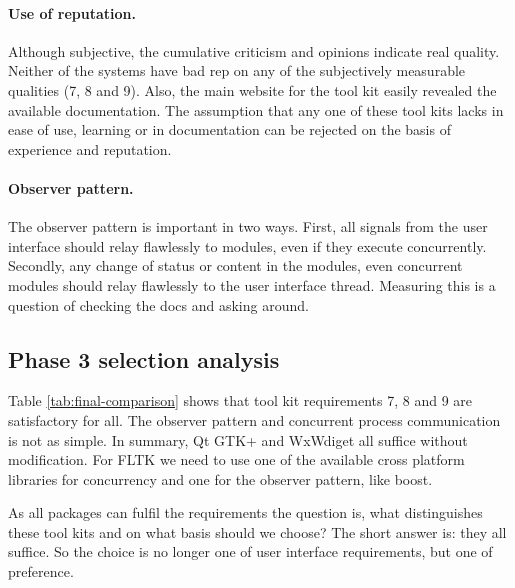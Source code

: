\paragraph{Use of reputation.} Although subjective, the cumulative criticism
and opinions indicate real quality. Neither of the systems have bad rep on any
of the subjectively measurable qualities (7, 8 and 9). Also, the main website
for the tool kit easily revealed the available documentation. The assumption
that any one of these tool kits lacks in ease of use, learning or in
documentation can be rejected on the basis of experience and reputation. 

\paragraph{Observer pattern.} The observer pattern is important in two ways.
First, all signals from the user interface should relay flawlessly to modules,
even if they execute concurrently. Secondly, any change of status or content in
the modules, even concurrent modules should relay flawlessly to the user
interface thread. Measuring this is a question of checking the docs and asking
around. 


\subsection{Phase 3 selection analysis}

Table \ref{tab:final-comparison} shows that tool kit requirements 7, 8 and 9
are satisfactory for all. The observer pattern and concurrent process
communication is not as simple. In summary, Qt GTK+ and WxWdiget all suffice
without modification. For FLTK we need to use one of the available cross
platform libraries for concurrency and one for the observer pattern, like
boost.

As all packages can fulfil the requirements the question is, what distinguishes
these tool kits and on what basis should we choose? The short answer is: they
all suffice. So the choice is no longer one of user interface requirements, but
one of preference. 

